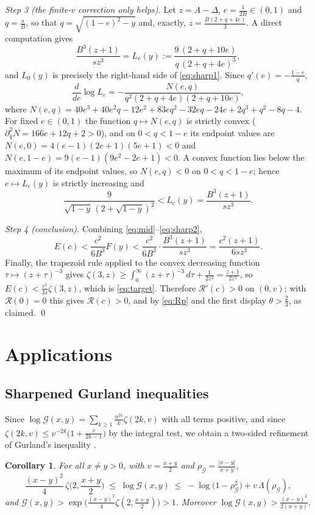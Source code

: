 \documentclass[11pt,a4paper]{amsart}
\newtheorem{corollary}[theorem]{Corollary}
\theoremstyle{definition}
\newcommand{\Gg}{\mathcal{G}}
\begin{document}
\emph{Step 3 (the finite-$v$ correction only helps).} Let $z=A-\Delta$,
$e=\frac{1}{2B}\in(0,1)$ and $q=\frac{s}{B}$, so that
$q=\sqrt{(1-e)^{2}-y}$ and, exactly, $z=\frac{B(2+q+4e)}{3}$. A direct computation gives
\[
  \frac{B^{3}(z+1)}{sz^{3}}=L_e(y):=\frac{9\,(2+q+10e)}{q\,(2+q+4e)^{3}},
\]
and $L_0(y)$ is precisely the right-hand side of \eqref{eq:sharp1}. Since
$q'(e)=-\frac{1-e}{q}$,
\[
  \frac{d}{de}\log L_e=-\frac{N(e,q)}{q^{2}(2+q+4e)(2+q+10e)},
\]
where
$N(e,q)=40e^{3}+40e^{2}q-12e^{2}+83eq^{2}-32eq-24e+2q^{3}+q^{2}-8q-4$. For fixed
$e\in(0,1)$ the function $q\mapsto N(e,q)$ is strictly convex
($\partial_{q}^{2}N=166e+12q+2>0$), and on $0<q<1-e$ its endpoint values are
$N(e,0)=4(e-1)(2e+1)(5e+1)<0$ and
$N(e,1-e)=9(e-1)(9e^{2}-2e+1)<0$. A convex function lies below the maximum of its
endpoint values, so $N(e,q)<0$ on $0<q<1-e$; hence $e\mapsto L_e(y)$ is strictly
increasing and
\begin{equation}\label{eq:sharp2}
  \frac{9}{\sqrt{1-y}\,(2+\sqrt{1-y})^{2}}<L_e(y)=\frac{B^{3}(z+1)}{sz^{3}} .
\end{equation}

\emph{Step 4 (conclusion).} Combining \eqref{eq:mid}--\eqref{eq:sharp2},
\[
  E(c)<\frac{c^{2}}{6B^{3}}F(y)<\frac{c^{2}}{6B^{3}}\cdot\frac{B^{3}(z+1)}{sz^{3}}
        =\frac{c^{2}(z+1)}{6sz^{3}} .
\]
Finally, the trapezoid rule applied to the convex decreasing function
$\tau\mapsto(z+\tau)^{-3}$ gives
$\zeta(3,z)\ge\int_{0}^{\infty}(z+\tau)^{-3}\,d\tau+\frac{1}{2z^{3}}=\frac{z+1}{2z^{3}}$, so
$E(c)<\frac{c^{2}}{3s}\zeta(3,z)$, which is \eqref{eq:target}. Therefore
$\mathcal{R}'(c)>0$ on $(0,v)$; with $\mathcal{R}(0)=0$ this gives $\mathcal{R}(c)>0$, and
by \eqref{eq:Rp} and the first display $\theta>\frac23$, as claimed. \qed

\section{Applications}\label{sec:app}

\subsection{Sharpened Gurland inequalities}
Since $\log\Gg(x,y)=\sum_{k\ge1}\frac{u^{2k}}{k}\zeta(2k,v)$ with all terms positive, and
since $\zeta(2k,v)\le v^{-2k}\big(1+\frac{v}{2k-1}\big)$ by the integral test, we obtain a
two-sided refinement of Gurland's inequality \cite{Gurland56}.

\begin{corollary}\label{cor:gurland}
For all $x\ne y>0$, with $v=\frac{x+y}{2}$ and $\rho_{\Gg}=\frac{|x-y|}{x+y}$,
\[
  \frac{(x-y)^{2}}{4}\,\zeta\Big(2,\frac{x+y}{2}\Big)\;\le\;\log\Gg(x,y)\;\le\;
  -\log\big(1-\rho_{\Gg}^{2}\big)+v\,\Lambda(\rho_{\Gg}),
\]
and $\Gg(x,y)>\exp\big(\frac{(x-y)^{2}}{4}\zeta(2,\frac{x+y}{2})\big)>1$. Moreover
$\log\Gg(x,y)>\frac{(x-y)^{2}}{2(x+y)}$.
\end{corollary}
\end{document}

